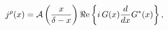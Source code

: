 \begin{equation}
j^{\rho }(x) ={\cal A}\left(\frac{x}{
\delta-x}\right)\Re \mbox{e}\left\{i\,G(x)\frac{d}{dx}G^{\ast }(
x)
\right\},
\label{alfincarajo}
\end{equation}

